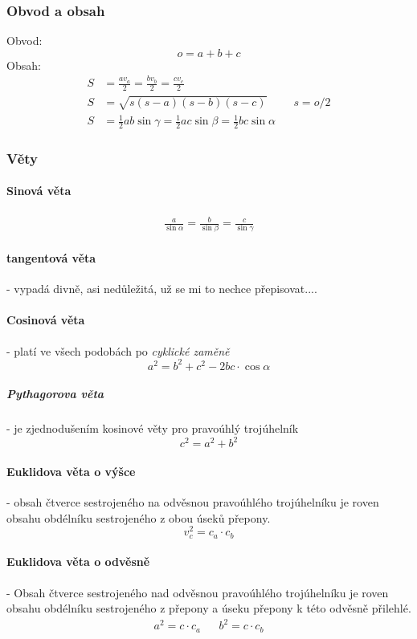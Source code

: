 \documentclass[12pt]{article}
\begin{document}
\subsubsection{Obvod a obsah}
Obvod:
\begin{equation}
o = a +b+c
\end{equation}
Obsah:
\begin{align}
S &= \frac{av_a}{2} = \frac{bv_b}{2} = \frac{cv_c}{2}\\
S &= \sqrt{s(s-a)(s-b)(s-c)} && s =o/2\\
S &= \frac{1}{2}ab\sin\gamma = \frac{1}{2}ac\sin\beta = \frac{1}{2}bc\sin\alpha
\end{align}
\subsubsection{Věty}
\label{sec:troj-vety}
\paragraph{Sinová věta}
\begin{align}
\frac{a}{\sin\alpha} =\frac{b}{\sin\beta} = \frac{c}{\sin\gamma}
\end{align}
\paragraph{tangentová věta} - vypadá divně, asi nedůležitá, už se mi to nechce přepisovat....
\paragraph{Cosinová věta} - platí ve všech podobách po \emph{cyklické zaměně}
\begin{equation}
a^2 = b^2 + c^2 - 2bc \cdot \cos \alpha
\end{equation}
\subparagraph{Pythagorova věta} - je zjednodušením kosinové věty pro pravoúhlý trojúhelník
\begin{equation}
c^2 = a^2 + b^2
\end{equation}
\paragraph{Euklidova věta o výšce} - obsah čtverce sestrojeného na odvěsnou pravoúhlého trojúhelníku je roven obsahu obdélníku sestrojeného z obou úseků přepony.
\begin{equation}
v_c^2 = c_a \cdot c_b
\end{equation}
\paragraph{Euklidova věta o odvěsně} - Obsah čtverce sestrojeného nad odvěsnou pravoúhlého trojúhelníku je roven obsahu obdélníku sestrojeného z přepony a úseku přepony k této odvěsně přilehlé.
\begin{align}
a^2 = c \cdot c_a && b^2 = c \cdot c_b 
\end{align}
\end{document}

